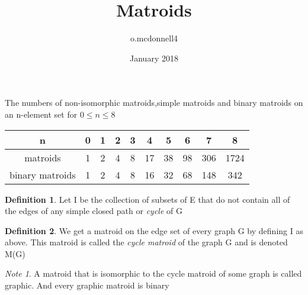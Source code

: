\documentclass{article}
\title{Matroids}
\author{o.mcdonnell4 }
\date{January 2018}
\theoremstyle{plain}
\theoremstyle{definition}
\newtheorem{defn}{Definition}[section]
\theoremstyle{remark}
\newtheorem*{note}{Note}
\begin{document}
\maketitle

The numbers of non-isomorphic matroids,simple matroids and binary matroids on an n-element set for $0 \leq n \leq  8$

\begin{center}

 \begin{tabular}{| c c c c c c c c c c |} 
 \hline
 n & 0 & 1 & 2 & 3 & 4 & 5 & 6 & 7 & 8 \\ [0.5ex] 
 \hline\hline
 matroids & 1 & 2 & 4 & 8 & 17 & 38 & 98 & 306 & 1724\\ 
 \hline
 binary matroids & 1 & 2 & 4 & 8 & 16 & 32 & 68 & 148 & 342\\
 \hline
\end{tabular}
\end{center}

\begin{defn}
    Let I be the collection of subsets of E that do not contain all of the edges of any simple closed path or \textit{cycle} of G
\end{defn}

\begin{defn}
    We get a matroid on the edge set of every graph G by defining I as above. This matroid is called the \textit{cycle matroid} of the graph G and is denoted M(G)
\end{defn}

\begin{note}
A matroid that is isomorphic to the cycle matroid of some graph is called graphic.
And every graphic matroid is binary
\end{note}
\end{document}
